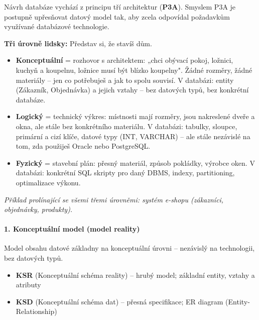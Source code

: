 Návrh databáze vychází z principu tří architektur (\textbf{P3A}). Smyslem P3A je postupně upřesňovat
datový model tak, aby zcela odpovídal požadavkům využívané databázové technologie.

\textbf{Tři úrovně lidsky:} Představ si, že stavíš dům.
\begin{itemize}
  \item \textbf{Konceptuální} = rozhovor s architektem: „chci obývací pokoj, ložnici, kuchyň a koupelnu, ložnice musí být blízko koupelny". Žádné rozměry, žádné materiály -- jen co potřebuješ a jak to spolu souvisí. V databázi: entity (Zákazník, Objednávka) a jejich vztahy -- bez datových typů, bez konkrétní databáze.
  \item \textbf{Logický} = technický výkres: místnosti mají rozměry, jsou nakreslené dveře a okna, ale stále bez konkrétního materiálu. V databázi: tabulky, sloupce, primární a cizí klíče, datové typy (INT, VARCHAR) -- ale stále nezávislé na tom, zda použiješ Oracle nebo PostgreSQL.
  \item \textbf{Fyzický} = stavební plán: přesný materiál, způsob pokládky, výrobce oken. V databázi: konkrétní SQL skripty pro daný DBMS, indexy, partitioning, optimalizace výkonu.
\end{itemize}

\textit{Příklad prolínající se všemi třemi úrovněmi: systém e-shopu (zákazníci, objednávky, produkty).}

\paragraph{1. Konceptuální model (model reality)}
Model obsahu datové základny na konceptuální úrovni -- nezávislý na technologii, bez datových typů.
\begin{itemize}
  \item \textbf{KSR} (Konceptuální schéma reality) -- hrubý model; základní entity, vztahy a atributy
  \item \textbf{KSD} (Konceptuální schéma dat) -- přesná specifikace; ER diagram (Entity-Relationship)
\end{itemize}

